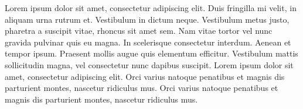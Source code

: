 \documentclass[../report.tex]{subfiles}
\begin{document}
Lorem ipsum dolor sit amet, consectetur adipiscing elit. Duis fringilla mi velit, in aliquam urna rutrum et. Vestibulum in dictum neque. Vestibulum metus justo, pharetra a suscipit vitae, rhoncus sit amet sem. Nam vitae tortor vel nunc gravida pulvinar quis eu magna. In scelerisque consectetur interdum. Aenean et tempor ipsum. Praesent mollis augue quis elementum efficitur. Vestibulum mattis sollicitudin magna, vel consectetur nunc dapibus suscipit. Lorem ipsum dolor sit amet, consectetur adipiscing elit. Orci varius natoque penatibus et magnis dis parturient montes, nascetur ridiculus mus. Orci varius natoque penatibus et magnis dis parturient montes, nascetur ridiculus mus. \\

\cite{eriksson2011comparison} \\

\cite{goff2001xmlserialization} \\

\cite{kazuaki2011survey} \\

\cite{sumaray2012efficiency} \\

\cite{tauro2012binary} \\

\cite{vanura2018performance}
\end{document}
